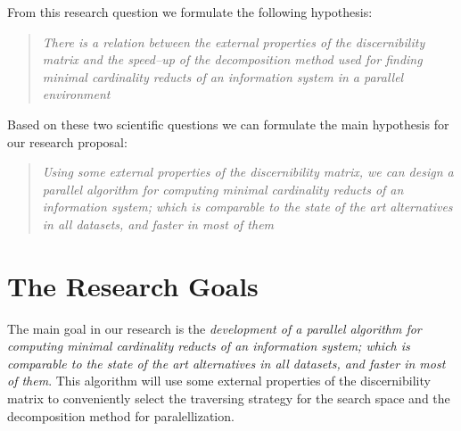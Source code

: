 \documentclass[11pt]{article}   %
\begin{document}
  From this research question we formulate the following hypothesis:
    
\begin{quote}
  \emph{There is a relation between the external properties of the discernibility matrix and the 
  		speed--up of the decomposition method used for finding minimal cardinality reducts of an information
  		system in a parallel environment}
\end{quote}

  Based on these two scientific questions we can formulate the main hypothesis for our research proposal:
  
\begin{quote}
  \emph{Using some external properties of the discernibility matrix, we can design a parallel algorithm 
  		for computing minimal cardinality reducts of an information system; which is comparable to the 
  		state of the art alternatives in all datasets, and faster in most of them}
\end{quote}  

\section{The Research Goals}\label{Goals} 
  The main goal in our research is the \emph{development of  a parallel algorithm for computing minimal
  cardinality reducts of an information system; which is comparable to the state of the art alternatives 
  in all datasets, and faster in most of them}. This algorithm will use some external properties of the
  discernibility matrix to conveniently select the traversing strategy for the search space and the 
  decomposition method for paralellization.
  
\end{document}
